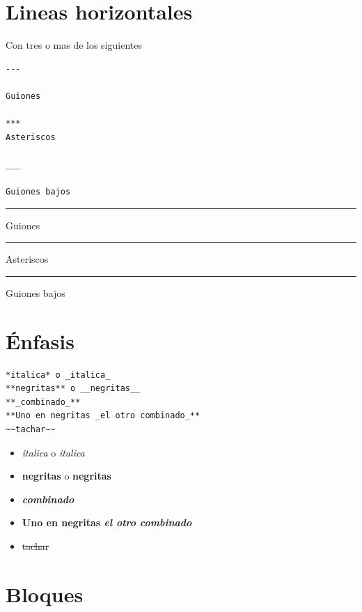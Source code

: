 \documentclass[]{article}
\providecommand{\tightlist}{%
  \setlength{\itemsep}{0pt}\setlength{\parskip}{0pt}}
\begin{document}
\section{Lineas horizontales}\label{lineas-horizontales}

Con tres o mas de los siguientes

\begin{verbatim}
---

Guiones

***
Asteriscos

___

Guiones bajos
\end{verbatim}

\begin{center}\rule{0.5\linewidth}{\linethickness}\end{center}

Guiones

\begin{center}\rule{0.5\linewidth}{\linethickness}\end{center}

Asteriscos

\begin{center}\rule{0.5\linewidth}{\linethickness}\end{center}

Guiones bajos

\section{Énfasis}\label{enfasis}

\begin{verbatim}
*italica* o _italica_
**negritas** o __negritas__
**_combinado_**
**Uno en negritas _el otro combinado_**
~~tachar~~
\end{verbatim}

\begin{itemize}
\tightlist
\item
  \emph{italica} o \emph{italica}
\item
  \textbf{negritas} o \textbf{negritas}
\item
  \textbf{\emph{combinado}}
\item
  \textbf{Uno en negritas \emph{el otro combinado}}
\item
  \sout{tachar}
\end{itemize}

\section{Bloques}\label{bloques}
\end{document}
